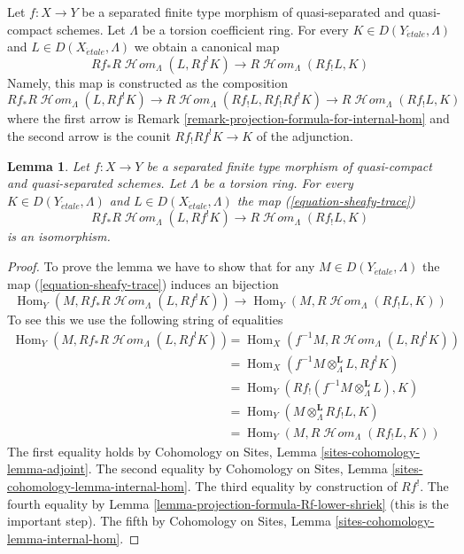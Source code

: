 \documentclass{stacks-project}
\theoremstyle{plain}
\newtheorem{lemma}[subsection]{Lemma}
\theoremstyle{definition}
\theoremstyle{remark}
\numberwithin{equation}{subsection}
\def\Hom{\mathop{\mathrm{Hom}}\nolimits}
\def\SheafHom{\mathop{\mathcal{H}\!\mathit{om}}\nolimits}
\def\etale{{\acute{e}tale}}
\begin{document}
\noindent
Let $f : X \to Y$ be a separated finite type morphism of quasi-separated
and quasi-compact schemes. Let $\Lambda$ be a torsion coefficient ring.
For every $K \in D(Y_\etale, \Lambda)$ and $L \in D(X_\etale, \Lambda)$
we obtain a canonical map
\begin{equation}
\label{equation-sheafy-trace}
Rf_*R\SheafHom_\Lambda(L, Rf^!K) \longrightarrow R\SheafHom_\Lambda(Rf_!L, K)
\end{equation}
Namely, this map is constructed as the composition
$$
Rf_*R\SheafHom_\Lambda(L, Rf^!K) \to
R\SheafHom_\Lambda(Rf_!L, Rf_!Rf^!K) \to
R\SheafHom_\Lambda(Rf_!L, K)
$$
where the first arrow is
Remark \ref{remark-projection-formula-for-internal-hom}
and the second arrow is the counit $Rf_!Rf^!K \to K$ of the adjunction.

\begin{lemma}
\label{lemma-iso-on-RSheafHom}
Let $f : X \to Y$ be a separated finite type morphism of quasi-compact and
quasi-separated schemes. Let $\Lambda$ be a torsion ring.
For every $K \in D(Y_\etale, \Lambda)$ and $L \in D(X_\etale, \Lambda)$
the map (\ref{equation-sheafy-trace})
$$
Rf_*R\SheafHom_\Lambda(L, Rf^!K) \longrightarrow R\SheafHom_\Lambda(Rf_!L, K)
$$
is an isomorphism.
\end{lemma}

\begin{proof}
To prove the lemma we have to show that for any $M \in D(Y_\etale, \Lambda)$
the map (\ref{equation-sheafy-trace}) induces an bijection
$$
\Hom_Y(M, Rf_*R\SheafHom_\Lambda(L, Rf^!K))
\longrightarrow
\Hom_Y(M, R\SheafHom_\Lambda(Rf_!L, K))
$$
To see this we use the following string of equalities
\begin{align*}
\Hom_Y(M, Rf_*R\SheafHom_\Lambda(L, Rf^!K))
& =
\Hom_X(f^{-1}M, R\SheafHom_\Lambda(L, Rf^!K)) \\
& =
\Hom_X(f^{-1}M \otimes_\Lambda^\mathbf{L} L, Rf^!K) \\
& =
\Hom_Y(Rf_!(f^{-1}M \otimes_\Lambda^\mathbf{L} L), K) \\
& =
\Hom_Y(M \otimes_\Lambda^\mathbf{L} Rf_!L, K) \\
& =
\Hom_Y(M, R\SheafHom_\Lambda(Rf_!L, K))
\end{align*}
The first equality holds by
Cohomology on Sites, Lemma \ref{sites-cohomology-lemma-adjoint}.
The second equality by
Cohomology on Sites, Lemma \ref{sites-cohomology-lemma-internal-hom}.
The third equality by construction of $Rf^!$.
The fourth equality by Lemma \ref{lemma-projection-formula-Rf-lower-shriek}
(this is the important step).
The fifth by
Cohomology on Sites, Lemma \ref{sites-cohomology-lemma-internal-hom}.
\end{proof}
\end{document}
